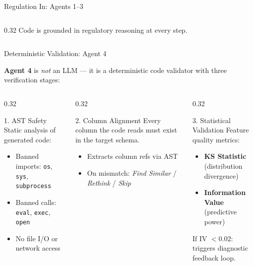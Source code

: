 \documentclass[10pt, aspectratio=169]{beamer}
\newcommand{\hlg}[1]{\textcolor{accentgreen}{#1}}
\begin{document}
\begin{frame}{Regulation In: Agents 1--3}
\begin{columns}[T]
\begin{column}{0.32\textwidth}
  \vspace{0.3em}
  Code is grounded in regulatory reasoning at every step.
\end{column}
\end{columns}

\end{frame}

\begin{frame}{Deterministic Validation: Agent 4}

\textbf{\hlg{Agent 4}} is \textit{not} an LLM --- it is a deterministic code validator with three verification stages:

\vspace{0.5em}
\begin{columns}[T]
\begin{column}{0.32\textwidth}
  \begin{exampleblock}{1. AST Safety}
    \scriptsize
    Static analysis of generated code:
    \begin{itemize}\itemsep0.15em
      \item Banned imports: \texttt{os}, \texttt{sys}, \texttt{subprocess}
      \item Banned calls: \texttt{eval}, \texttt{exec}, \texttt{open}
      \item No file I/O or network access
    \end{itemize}
  \end{exampleblock}
\end{column}

\begin{column}{0.32\textwidth}
  \begin{exampleblock}{2. Column Alignment}
    \scriptsize
    Every column the code reads must exist in the target schema.
    \begin{itemize}\itemsep0.15em
      \item Extracts column refs via AST
      \item On mismatch: \textit{Find Similar} / \textit{Rethink} / \textit{Skip}
    \end{itemize}
  \end{exampleblock}
\end{column}

\begin{column}{0.32\textwidth}
  \begin{exampleblock}{3. Statistical Validation}
    \scriptsize
    Feature quality metrics:
    \begin{itemize}\itemsep0.15em
      \item \textbf{KS Statistic} (distribution divergence)
      \item \textbf{Information Value} (predictive power)
    \end{itemize}
    If IV \(< 0.02\): triggers diagnostic feedback loop.
  \end{exampleblock}
\end{column}
\end{columns}


\end{frame}
\end{document}
